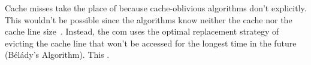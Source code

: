 Cache misses take the place of   because
cache-oblivious algorithms don't 
explicitly.  This wouldn't be possible since the algorithms know neither the cache nor
the cache line size~\cite[5]{erikcom}.
Instead, the \gls{com} uses the optimal replacement strategy of evicting the cache line
that won't be accessed for the longest time in the future (Bélády's Algorithm).  This
.
%
%
%
%
%
